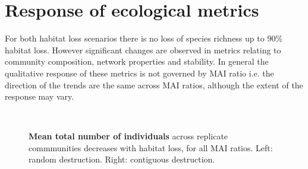 
\section{Response of ecological metrics}
\label{sec:results}


For both habitat loss scenarios there is no loss of species richness up to $90 \%$ habitat loss. However significant changes are observed in metrics relating to community composition, network properties and stability. In general the qualitative response of these metrics is not governed by MAI ratio i.e. the direction of the trends are the same across MAI ratios, although the extent of the response may vary.

\begin{figure} 
		\centering      
		\renewcommand{\thesubfigure}{}%
		\tightsubcaptions %
		\setlength{\subfloatlabelskip}{0pt}%
		
%
        ~

        \caption{\textbf{Mean total number of individuals} across replicate commmunities decreases with habitat loss, for all MAI ratios. Left: random destruction. Right: contiguous destruction.}\label{fig:total_abundance}
\end{figure}

